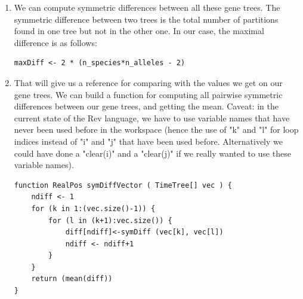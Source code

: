 \documentclass[11pt]{article}
\begin{document}
{\begin{framed}
\begin{enumerate}
We write the data to file,  in the "dataFolder" directory.
{\tt \begin{snugshade*}
\begin{lstlisting}

# We need to save the species tree and the gene trees
write(speciesTree, filename=dataFolder+"speciesTree")

# Saving the gene trees
for (i in 1:(n_genes)) {
	write(geneTrees[i], filename=dataFolder+"geneTree_"+i+".tree")
}

\end{lstlisting}
\end{snugshade*}}


\item We can compute symmetric differences between all these gene trees. The symmetric difference between two trees is the total number of partitions found in one tree but not in the other one. In our case, the maximal difference is as follows:
{\tt \begin{snugshade*}
\begin{lstlisting}
maxDiff <- 2 * (n_species*n_alleles - 2)
\end{lstlisting}
\end{snugshade*}}
\item That will give us a reference for comparing with the values we get on our gene trees. We can build a function for computing all pairwise symmetric differences between our gene trees, and getting the mean. Caveat: in the current state of the Rev language, we have to use variable names that have never been used before in the workspace (hence the use of "k" and "l" for loop indices instead of "i" and "j" that have been used before. Alternatively we could have done a "clear(i)" and a "clear(j)" if we really wanted to use these variable names). 

{\tt \begin{snugshade*}
\begin{lstlisting}
function RealPos symDiffVector ( TimeTree[] vec ) {
	ndiff <- 1
	for (k in 1:(vec.size()-1)) {
		for (l in (k+1):vec.size()) {
			diff[ndiff]<-symDiff (vec[k], vec[l])
			ndiff <- ndiff+1
		}
	}
	return (mean(diff))
}



\end{lstlisting}
\end{snugshade*}}
\end{enumerate}
\end{framed}}
\end{document}
